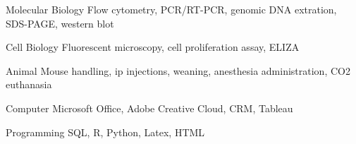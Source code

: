 

\begin{cvskills}

  \cvskill
    {Molecular Biology} %
    {Flow cytometry, PCR/RT-PCR, genomic DNA extration, SDS-PAGE, western blot} %

  \cvskill
    {Cell Biology} %
    {Fluorescent microscopy, cell proliferation assay, ELIZA} %

  \cvskill
    {Animal} %
    {Mouse handling, ip injections, weaning, anesthesia administration, CO2 euthanasia } %

  \cvskill
    {Computer} %
    {Microsoft Office, Adobe Creative Cloud, CRM, Tableau} %

  \cvskill
    {Programming} %
    {SQL, R, Python, Latex, HTML} %

\end{cvskills}
